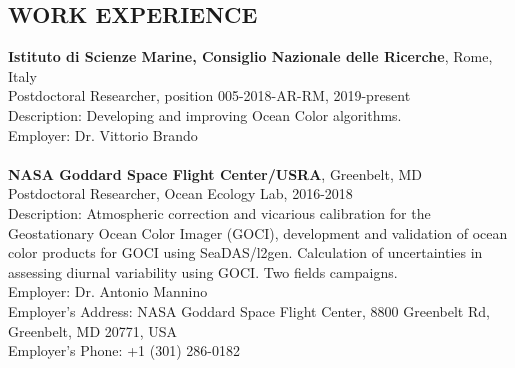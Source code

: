 \documentclass[11pt]{res}
\begin{document}
\begin{resume}
\section{WORK EXPERIENCE}
\vspace{0.1in}
{\bf Istituto di Scienze Marine, Consiglio Nazionale delle Ricerche}, Rome, Italy\\
Postdoctoral Researcher, position 005-2018-AR-RM, 2019-present\\
Description: Developing and improving Ocean Color algorithms.\\
Employer: Dr. Vittorio Brando\\
\vspace{0.1in}\\
{\bf NASA Goddard Space Flight Center/USRA}, Greenbelt, MD\\
Postdoctoral Researcher, Ocean Ecology Lab, 2016-2018\\
Description: Atmospheric correction and vicarious calibration for the Geostationary Ocean Color Imager (GOCI), development and validation of ocean color products for GOCI using SeaDAS/l2gen. Calculation of uncertainties in assessing diurnal variability using GOCI. Two fields campaigns.\\
Employer: Dr. Antonio Mannino\\
Employer's Address: NASA Goddard Space Flight Center, 8800 Greenbelt Rd, Greenbelt, MD 20771, USA\\
Employer's Phone: +1 (301) 286-0182\\


\end{resume}
\end{document}
